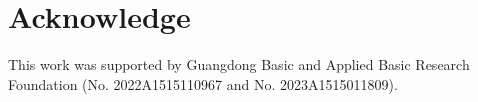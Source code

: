 \documentclass[11pt,twoside]{article}
\theoremstyle{definition}
\theoremstyle{remark}
\begin{document}















\section{Acknowledge}
This work was supported by Guangdong Basic and Applied Basic Research Foundation (No. 2022A1515110967 and No. 2023A1515011809).


\end{document}
